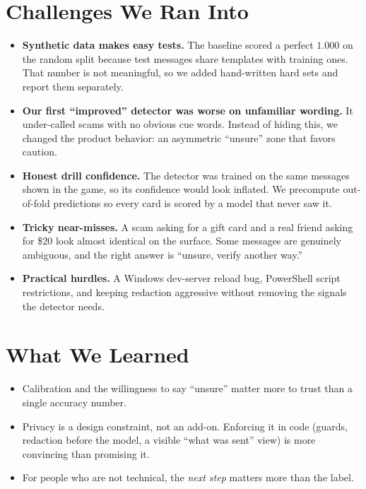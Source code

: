 \documentclass[11pt]{article}
\begin{document}
\section*{Challenges We Ran Into}
\begin{itemize}
  \item \textbf{Synthetic data makes easy tests.} The baseline scored a perfect $1.000$ on the random split because test messages share templates with training ones. That number is not meaningful, so we added hand-written hard sets and report them separately.
  \item \textbf{Our first ``improved'' detector was worse on unfamiliar wording.} It under-called scams with no obvious cue words. Instead of hiding this, we changed the product behavior: an asymmetric ``unsure'' zone that favors caution.
  \item \textbf{Honest drill confidence.} The detector was trained on the same messages shown in the game, so its confidence would look inflated. We precompute out-of-fold predictions so every card is scored by a model that never saw it.
  \item \textbf{Tricky near-misses.} A scam asking for a gift card and a real friend asking for \$20 look almost identical on the surface. Some messages are genuinely ambiguous, and the right answer is ``unsure, verify another way.''
  \item \textbf{Practical hurdles.} A Windows dev-server reload bug, PowerShell script restrictions, and keeping redaction aggressive without removing the signals the detector needs.
\end{itemize}

\section*{What We Learned}
\begin{itemize}
  \item Calibration and the willingness to say ``unsure'' matter more to trust than a single accuracy number.
  \item Privacy is a design constraint, not an add-on. Enforcing it in code (guards, redaction before the model, a visible ``what was sent'' view) is more convincing than promising it.
  \item For people who are not technical, the \emph{next step} matters more than the label.
\end{itemize}
\end{document}
